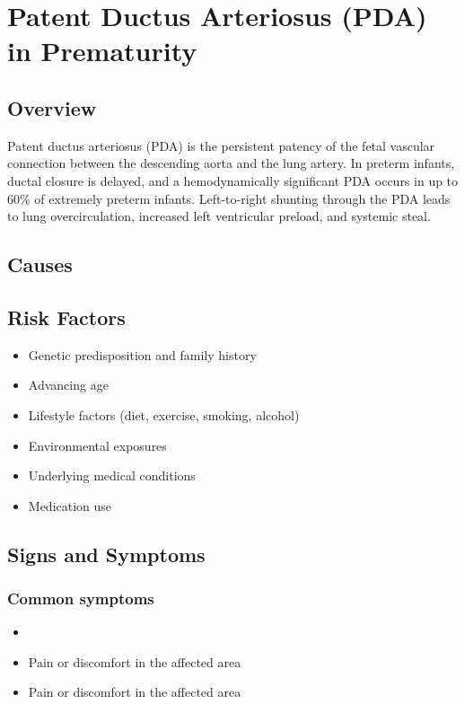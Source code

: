 \chapter{Patent Ductus Arteriosus (PDA) in Prematurity}
\label{sec:Patent Ductus Arteriosus in Prematurity}

\section{Overview}
Patent ductus arteriosus (PDA) is the persistent patency of the fetal vascular connection between the descending aorta and the lung artery. In preterm infants, ductal closure is delayed, and a hemodynamically significant PDA occurs in up to 60\% of extremely preterm infants. Left-to-right shunting through the PDA leads to lung overcirculation, increased left ventricular preload, and systemic steal.
\section{Causes}
\section{Risk Factors}

\begin{itemize}[noitemsep]
  \item Genetic predisposition and family history
  \item Advancing age
  \item Lifestyle factors (diet, exercise, smoking, alcohol)
  \item Environmental exposures
  \item Underlying medical conditions
  \item Medication use
\end{itemize}
\section{Signs and Symptoms}

\subsection{Common symptoms}
\begin{itemize}[noitemsep]
  \item \item Pain or discomfort in the affected area    \item Pain or discomfort in the affected area
  \end{itemize}

